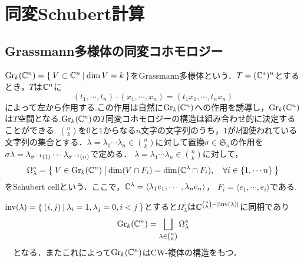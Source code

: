 \section{同変Schubert計算}
\subsection{Grassmann多様体の同変コホモロジー}
$\text{Gr}_k(\mathbb{C}^n)=\left\{\:V\subset \mathbb{C}^n\:\middle|\:\dim V = k\:\right\}$をGrassmann多様体という．$T=(\mathbb{C}^*)^n$とするとき，$T$は$\mathbb{C}^n$に
\[
(t_1,\cdots,t_n)\cdot(x_1,\cdots,x_n)=(t_1x_1,\cdots,t_nx_n)
\]
によって左から作用する.この作用は自然に$\text{Gr}_k(\mathbb{C}^n)$への作用を誘導し，$\text{Gr}_k(\mathbb{C}^n)$は$T$空間となる.$\text{Gr}_k(\mathbb{C}^n)$の$T$同変コホモロジーの構造は組み合わせ的に決定することができる.
$\binom{n}{k}$を$0$と$1$からなる$n$文字の文字列のうち，$1$が$k$個使われている文字列の集合とする．$\lambda=\lambda_1\cdots \lambda_n\in\binom{n}{k}$に対して置換$\sigma\in\mathfrak{S}_n$の作用を$\sigma\lambda=\lambda_{\sigma^{-1}(1)}\cdots\lambda_{\sigma^{-1}(n)}$で定める．
$\lambda=\lambda_1\cdots \lambda_n\in\binom{n}{k}$に対して，
\[
\Omega_\lambda^\circ=\left\{\:V\in \text{Gr}_k(\mathbb{C}^n)\:\middle|\:\dim(V\cap F_i)= \dim(\mathbb{C}^{\lambda}\cap F_i),\quad \forall i\in \{1,\cdots n\}\:\right\}
\]
をSchubert cellという．ここで，$\mathbb{C}^{\lambda}=\langle\lambda_{1}e_{1},\cdots,\lambda_ne_n\rangle$， $F_i=\langle e_{1},\cdots,e_i\rangle$である. 

\begin{prop}
  $\text{inv}(\lambda)=\left\{\:(i,j)\:\middle|\:\lambda_i=1, \lambda_j=0, i<j\:\right\}$とすると$\Omega_\lambda^\circ$は$\mathbb{C}^{\binom{n}{k}-|\text{inv}(\lambda)|}$に同相であり
\begin{equation}\label{CW str of grassmannian}
\text{Gr}_k(\mathbb{C}^n)=\bigsqcup_{\lambda\in\binom{n}{k}}\Omega_\lambda^\circ
\end{equation}
　となる．またこれによって$\text{Gr}_k(\mathbb{C}^n)$はCW-複体の構造をもつ．
\end{prop}

